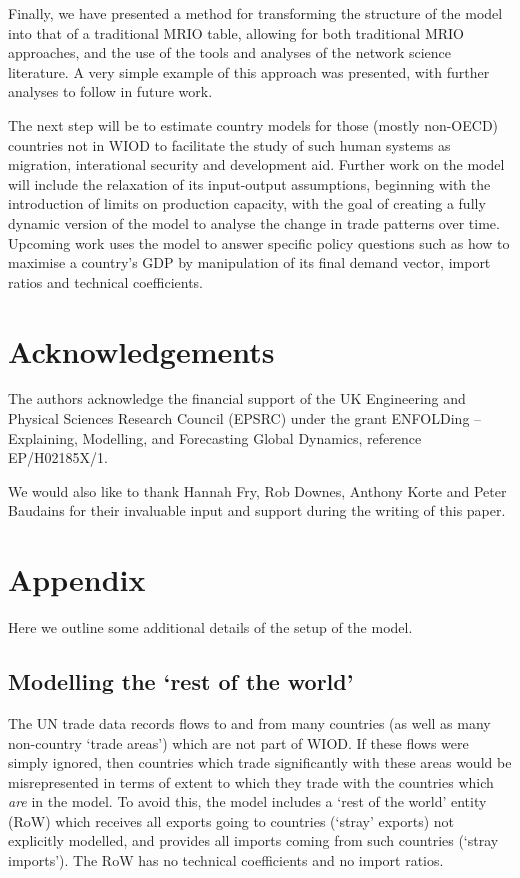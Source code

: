 \documentclass{article}
\begin{document}
Finally, we have presented a method for transforming the structure of the model into that of a traditional MRIO table, allowing for both traditional MRIO approaches, and the use of the tools and analyses of the network science literature.
A very simple example of this approach was presented, with further analyses to follow in future work.

The next step will be to estimate country models for those (mostly non-OECD) countries not in WIOD to facilitate the study of such human systems as migration, interational security and development aid.
Further work on the model will include the relaxation of its input-output assumptions, beginning with the introduction of limits on production capacity, with the goal of creating a fully dynamic version of the model to analyse the change in trade patterns over time.
Upcoming work uses the model to answer specific policy questions such as how to maximise a country's GDP by manipulation of its final demand vector, import ratios and technical coefficients.


\section*{Acknowledgements}

The authors acknowledge the financial support of the UK Engineering and Physical Sciences Research Council (EPSRC) under the grant ENFOLDing -- Explaining, Modelling, and Forecasting Global Dynamics, reference EP/H02185X/1. 

We would also like to thank Hannah Fry, Rob Downes, Anthony Korte and Peter Baudains for their invaluable input and support during the writing of this paper.


\printbibliography

\appendix
\section{Appendix}
Here we outline some additional details of the setup of the model.

\subsection{Modelling the `rest of the world'}\label{sec:RoW}
The UN trade data records flows to and from many countries (as well as many non-country `trade areas') which are not part of WIOD. If these flows were simply ignored, then countries which trade significantly with these areas would be misrepresented in terms of extent to which they trade with the countries which \textit{are} in the model. To avoid this, the model includes a `rest of the world' entity (RoW) which receives all exports going to countries (`stray' exports) not explicitly modelled, and provides all imports coming from such countries (`stray imports'). The RoW has no technical coefficients and no import ratios.
\end{document}
